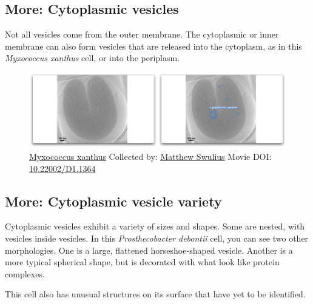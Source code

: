 \documentclass[]{tufte-book}
\begin{document}
\hypertarget{Cytoplasmic_vesicles}{\subsection*{More: Cytoplasmic
vesicles}\label{Cytoplasmic_vesicles}}

Not all vesicles come from the outer membrane. The cytoplasmic or inner
membrane can also form vesicles that are released into the cytoplasm, as
in this \emph{Myxococcus xanthus} cell, or into the periplasm.





\begin{figure}
\includegraphics{movie_stills/2_4c} \caption[\protect\hyperlink{tree}{Myxococcus xanthus} Collected by:
\protect\hyperlink{matthew_swulius}{Matthew Swulius} Movie DOI:
\href{https://doi.org/10.22002/D1.1364}{10.22002/D1.1364}]{\protect\hyperlink{tree}{Myxococcus xanthus} Collected by:
\protect\hyperlink{matthew_swulius}{Matthew Swulius} Movie DOI:
\href{https://doi.org/10.22002/D1.1364}{10.22002/D1.1364}}\label{fig:2-4c}
\end{figure}

\hypertarget{Cytoplasmic_vesicle_variety}{\subsection*{More: Cytoplasmic
vesicle variety}\label{Cytoplasmic_vesicle_variety}}

Cytoplasmic vesicles exhibit a variety of sizes and shapes. Some are
nested, with vesicles inside vesicles. In this \emph{Prosthecobacter
debontii} cell, you can see two other morphologies. One is a large,
flattened horseshoe-shaped vesicle. Another is a more typical spherical
shape, but is decorated with what look like protein complexes.

This cell also has unusual structures on its surface that have yet to be
identified.
\end{document}
